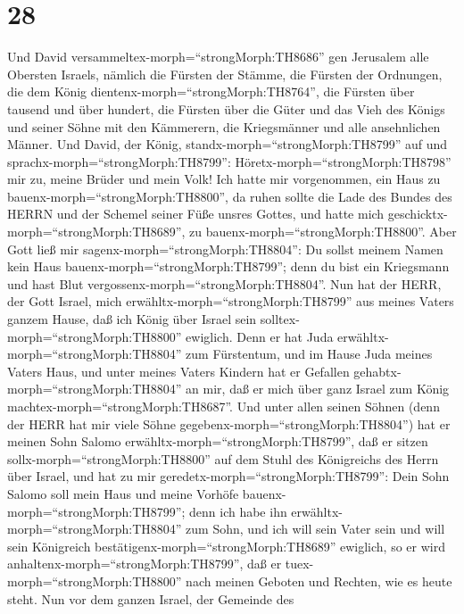 \hypertarget{section-27}{%
\section{28}\label{section-27}}

 Und David versammeltex-morph=``strongMorph:TH8686'' gen
Jerusalem alle Obersten Israels, nämlich die Fürsten der Stämme, die
Fürsten der Ordnungen, die dem König
dientenx-morph=``strongMorph:TH8764'', die Fürsten über tausend und über
hundert, die Fürsten über die Güter und das Vieh des Königs und seiner
Söhne mit den Kämmerern, die Kriegsmänner und alle ansehnlichen Männer.
 Und David, der König, standx-morph=``strongMorph:TH8799''
auf und sprachx-morph=``strongMorph:TH8799'':
Höretx-morph=``strongMorph:TH8798'' mir zu, meine Brüder und mein Volk!
Ich hatte mir vorgenommen, ein Haus zu
bauenx-morph=``strongMorph:TH8800'', da ruhen sollte die Lade des Bundes
des HERRN und der Schemel seiner Füße unsres Gottes, und hatte mich
geschicktx-morph=``strongMorph:TH8689'', zu
bauenx-morph=``strongMorph:TH8800''.  Aber Gott ließ mir
sagenx-morph=``strongMorph:TH8804'': Du sollst meinem Namen kein Haus
bauenx-morph=``strongMorph:TH8799''; denn du bist ein Kriegsmann und
hast Blut vergossenx-morph=``strongMorph:TH8804''.  Nun hat
der HERR, der Gott Israel, mich erwähltx-morph=``strongMorph:TH8799''
aus meines Vaters ganzem Hause, daß ich König über Israel sein
solltex-morph=``strongMorph:TH8800'' ewiglich. Denn er hat Juda
erwähltx-morph=``strongMorph:TH8804'' zum Fürstentum, und im Hause Juda
meines Vaters Haus, und unter meines Vaters Kindern hat er Gefallen
gehabtx-morph=``strongMorph:TH8804'' an mir, daß er mich über ganz
Israel zum König machtex-morph=``strongMorph:TH8687''.  Und
unter allen seinen Söhnen (denn der HERR hat mir viele Söhne
gegebenx-morph=``strongMorph:TH8804'') hat er meinen Sohn Salomo
erwähltx-morph=``strongMorph:TH8799'', daß er sitzen
sollx-morph=``strongMorph:TH8800'' auf dem Stuhl des Königreichs des
Herrn über Israel,  und hat zu mir
geredetx-morph=``strongMorph:TH8799'': Dein Sohn Salomo soll mein Haus
und meine Vorhöfe bauenx-morph=``strongMorph:TH8799''; denn ich habe ihn
erwähltx-morph=``strongMorph:TH8804'' zum Sohn, und ich will sein Vater
sein  und will sein Königreich
bestätigenx-morph=``strongMorph:TH8689'' ewiglich, so er wird
anhaltenx-morph=``strongMorph:TH8799'', daß er
tuex-morph=``strongMorph:TH8800'' nach meinen Geboten und Rechten, wie
es heute steht.  Nun vor dem ganzen Israel, der Gemeinde des
